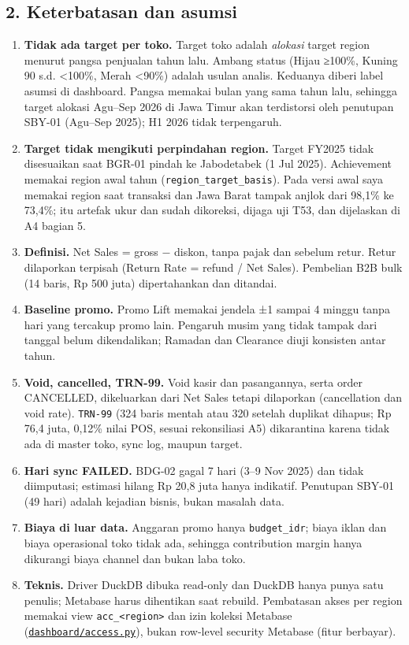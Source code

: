 \documentclass[10pt,a4paper]{article}
\providecommand{\tightlist}{\setlength{\itemsep}{1pt}\setlength{\parskip}{0pt}}
\begin{document}
\subsection{2. Keterbatasan dan asumsi}\label{keterbatasan-dan-asumsi}

\begin{enumerate}
\def\labelenumi{\arabic{enumi}.}
\tightlist
\item
  \textbf{Tidak ada target per toko.} Target toko adalah \emph{alokasi} target region menurut pangsa penjualan tahun lalu. Ambang status (Hijau ≥100\%, Kuning 90 s.d. \textless100\%, Merah \textless90\%) adalah usulan analis. Keduanya diberi label asumsi di dashboard. Pangsa memakai bulan yang sama tahun lalu, sehingga target alokasi Agu--Sep 2026 di Jawa Timur akan terdistorsi oleh penutupan SBY-01 (Agu--Sep 2025); H1 2026 tidak terpengaruh.
\item
  \textbf{Target tidak mengikuti perpindahan region.} Target FY2025 tidak disesuaikan saat BGR-01 pindah ke Jabodetabek (1 Jul 2025). Achievement memakai region awal tahun (\texttt{region\_\allowbreak{}target\_\allowbreak{}basis}). Pada versi awal saya memakai region saat transaksi dan Jawa Barat tampak anjlok dari 98,1\% ke 73,4\%; itu artefak ukur dan sudah dikoreksi, dijaga uji T53, dan dijelaskan di A4 bagian 5.
\item
  \textbf{Definisi.} Net Sales = gross − diskon, tanpa pajak dan sebelum retur. Retur dilaporkan terpisah (Return Rate = refund / Net Sales). Pembelian B2B bulk (14 baris, Rp 500 juta) dipertahankan dan ditandai.
\item
  \textbf{Baseline promo.} Promo Lift memakai jendela ±1 sampai 4 minggu tanpa hari yang tercakup promo lain. Pengaruh musim yang tidak tampak dari tanggal belum dikendalikan; Ramadan dan Clearance diuji konsisten antar tahun.
\item
  \textbf{Void, cancelled, TRN-99.} Void kasir dan pasangannya, serta order CANCELLED, dikeluarkan dari Net Sales tetapi dilaporkan (cancellation dan void rate). \texttt{TRN-99} (324 baris mentah atau 320 setelah duplikat dihapus; Rp 76,4 juta, 0,12\% nilai POS, sesuai rekonsiliasi A5) dikarantina karena tidak ada di master toko, sync log, maupun target.
\item
  \textbf{Hari sync FAILED.} BDG-02 gagal 7 hari (3--9 Nov 2025) dan tidak diimputasi; estimasi hilang Rp 20,8 juta hanya indikatif. Penutupan SBY-01 (49 hari) adalah kejadian bisnis, bukan masalah data.
\item
  \textbf{Biaya di luar data.} Anggaran promo hanya \texttt{budget\_\allowbreak{}idr}; biaya iklan dan biaya operasional toko tidak ada, sehingga contribution margin hanya dikurangi biaya channel dan bukan laba toko.
\item
  \textbf{Teknis.} Driver DuckDB dibuka read-only dan DuckDB hanya punya satu penulis; Metabase harus dihentikan saat rebuild. Pembatasan akses per region memakai view \texttt{acc\_\allowbreak{}\textless{}region\textgreater{}} dan izin koleksi Metabase (\href{https://github.com/titan2903/kirana-omnichannel-performance-intelligence/blob/master/dashboard/access.py}{\texttt{dashboard/access.py}}), bukan row-level security Metabase (fitur berbayar).
\end{enumerate}
\end{document}
